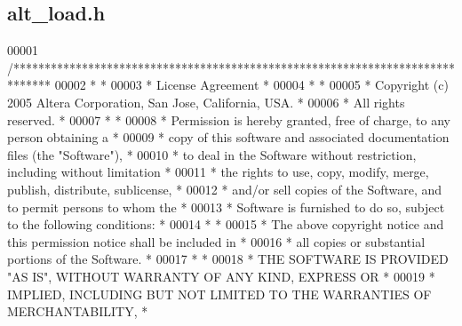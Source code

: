 \subsection{alt\+\_\+load.\+h}
\label{alt__load_8h_source}

\begin{DoxyCode}
00001 \textcolor{comment}{/******************************************************************************}
00002 \textcolor{comment}{*                                                                             *}
00003 \textcolor{comment}{* License Agreement                                                           *}
00004 \textcolor{comment}{*                                                                             *}
00005 \textcolor{comment}{* Copyright (c) 2005 Altera Corporation, San Jose, California, USA.           *}
00006 \textcolor{comment}{* All rights reserved.                                                        *}
00007 \textcolor{comment}{*                                                                             *}
00008 \textcolor{comment}{* Permission is hereby granted, free of charge, to any person obtaining a     *}
00009 \textcolor{comment}{* copy of this software and associated documentation files (the "Software"),  *}
00010 \textcolor{comment}{* to deal in the Software without restriction, including without limitation   *}
00011 \textcolor{comment}{* the rights to use, copy, modify, merge, publish, distribute, sublicense,    *}
00012 \textcolor{comment}{* and/or sell copies of the Software, and to permit persons to whom the       *}
00013 \textcolor{comment}{* Software is furnished to do so, subject to the following conditions:        *}
00014 \textcolor{comment}{*                                                                             *}
00015 \textcolor{comment}{* The above copyright notice and this permission notice shall be included in  *}
00016 \textcolor{comment}{* all copies or substantial portions of the Software.                         *}
00017 \textcolor{comment}{*                                                                             *}
00018 \textcolor{comment}{* THE SOFTWARE IS PROVIDED "AS IS", WITHOUT WARRANTY OF ANY KIND, EXPRESS OR  *}
00019 \textcolor{comment}{* IMPLIED, INCLUDING BUT NOT LIMITED TO THE WARRANTIES OF MERCHANTABILITY,    *}

\end{DoxyCode}
